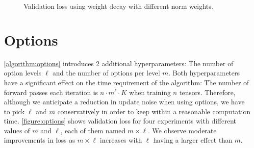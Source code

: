\begin{figure}
    \centering
    \caption[Validation loss using weight decay with different norm weights]
    {Validation loss using weight decay with different norm weights.}
    \label{figure:decay}
\end{figure}


\section{Options}
\autoref{algorithm:options} introduces 2 additional 
hyperparameters: The number of option levels $\ell$ and
the number of options per level $m$. Both hyperparameters
have a significant effect on 
the time requirement of the algorithm: The number of 
forward passes each iteration is $n \cdot m^\ell \cdot K$ 
when training $n$ tensors. Therefore, 
although we anticipate a reduction in update noise 
when using options, we have to pick $\ell$ and $m$ 
conservatively in order to keep within a reasonable 
computation time. \autoref{figure:options} shows validation 
loss for four experiments with different values of 
$m$ and $\ell$, each of them named $m \times \ell$.
We observe moderate improvements in loss as $m \times \ell$
increases with $\ell$ having a larger effect than $m$. 

